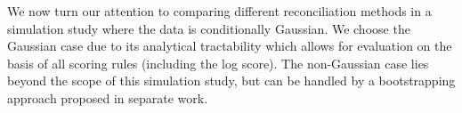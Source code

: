 \documentclass[a4paper, 11pt]{article}
\def\E{\text{E}}
\theoremstyle{theo}
\theoremstyle{definition}
\begin{document}
%
%
%
%
%
%



We now turn our attention to comparing different reconciliation methods in a simulation study where the data is conditionally Gaussian.  We choose the Gaussian case due to its analytical tractability which allows for evaluation on the basis of all scoring rules (including the log score).  The non-Gaussian case lies beyond the scope of this simulation study, but can be handled by a bootstrapping approach proposed in separate work.
\end{document}
